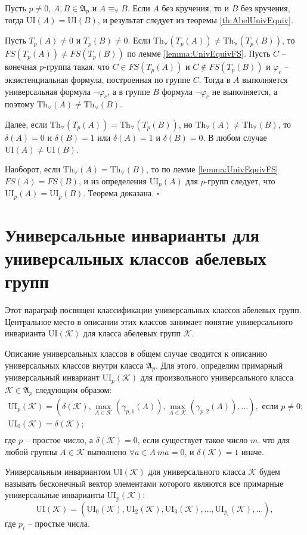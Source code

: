 \documentclass[a4paper,11pt,twoside]{article}
\def\A{{\mathfrak{A}}}
\def\K{{\mathcal{K}}}
\def\Tha{{\mathrm{Th}_\forall}}
\def\ui{{\mathrm{UI}}}
\begin{document}
Пусть $p \neq 0$, $A, B \in \A_p$ и $A \equiv_\forall B$. Если $A$ без кручения, то и $B$ без кручения, тогда $\ui(A) = \ui(B)$, и результат следует из теоремы \ref{th:AbelUnivEquiv}.

Пусть $T_p(A) \neq 0$ и $T_p(B) \neq 0$. Если $\Tha(T_p(A)) \neq \Tha(T_p(B))$, то $FS(T_p(A)) \neq FS(T_p(B))$ по лемме \ref{lemma:UnivEquivFS}. Пусть $C$ -- конечная $p$-группа такая, что $C \in FS(T_p(A))$ и $C \notin FS(T_p(B))$ и $\varphi_c$ -- экзистенциальная формула, построенная по группе $C$. Тогда в $A$ выполняется универсальная формула $\neg \varphi_c$, а в группе $B$ формула $\neg \varphi_c$ не выполняется, а поэтому $\Tha(A) \neq \Tha(B)$.

Далее, если $\Tha(T_p(A)) = \Tha(T_p(B))$, но $\Tha(A) \neq \Tha(B)$, то $\delta(A) = 0$ и $\delta(B) = 1$ или $\delta(A) = 1$ и $\delta(B) = 0$. В любом случае $\ui(A) \neq \ui(B)$. 

Наоборот, если $\Tha(A) = \Tha(B)$, то по лемме \ref{lemma:UnivEquivFS} $FS(A) = FS(B)$, и из определения $\ui_p(A)$ для $p$-групп следует, что $\ui_p(A) = \ui_p(B)$. Теорема доказана. $\square$


\section{Универсальные инварианты для универсальных классов абелевых групп}

Этот параграф посвящен классификации универсальных классов абелевых групп. Центральное место в описании этих классов занимает понятие универсального инварианта $\ui(\K)$ для класса абелевых групп $\K$. 

Описание универсальных классов в общем случае сводится к описанию универсальных классов внутри класса $\A_p$. Для этого, определим примарный универсальный инвариант $\ui_p(\K)$ для произвольного универсального класса $\K \in \A_p$ следующим образом:
$$\begin{array}{c}
\ui_p(\K) = (\delta(\K),  \max\limits_{A \in \K}(\gamma_{p,1}(A)), \max\limits_{A \in \K}(\gamma_{p,2}(A)), \ldots), \text{ если } p \neq 0; \\
\ui_0(\K) = \delta(\K); \\
\end{array}$$
где $p$ -- простое число, а $\delta(\K) = 0$, если существует такое число $m$, что для любой группы $A \in \K$ выполнено $\forall a \in A \ ma=0$, и $\delta(\K) = 1$ иначе.

Универсальным инвариантом $\ui(\K)$ для универсального класса $\K$ будем называть бесконечный вектор элементами которого являются все примарные универсальные инварианты $\ui_p(\K)$:
$$\ui(\K) = (\ui_0(\K), \ui_2(\K), \ui_3(\K), \ldots, \ui_{p_i}(\K), \ldots ),$$
где $p_i$ -- простые числа.
\end{document}
